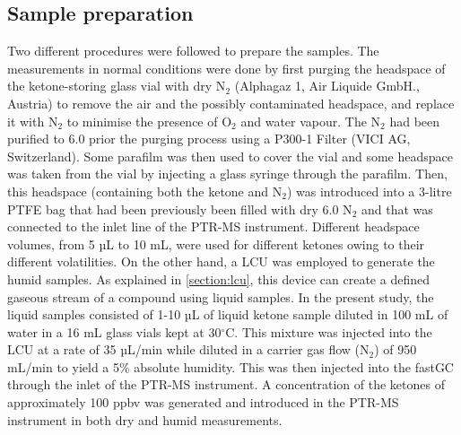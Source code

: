 \subsection{Sample preparation}
Two different procedures were followed to prepare the samples.
The measurements in normal conditions were done by first purging the headspace of the ketone-storing glass vial with dry N$_2$ (Alphagaz 1, Air Liquide GmbH., Austria) to remove the air and the possibly contaminated headspace, and replace it with N$_2$ to minimise the presence of O$_2$ and water vapour. The N$_2$ had been purified to 6.0 prior the purging process using a P300-1 Filter (VICI AG, Switzerland). Some parafilm was then used to cover the vial and some headspace was taken from the vial by injecting  a glass syringe through the parafilm. Then, this headspace (containing both the ketone and  N$_2$) was introduced into a 3-litre PTFE bag that had been previously been filled with dry 6.0 N$_2$ and that was connected to the inlet line of the PTR-MS instrument. Different headspace volumes, from 5 µL to 10 mL, were used for different ketones owing to their different volatilities.
On the other hand,  a LCU was employed to generate the humid samples. As explained in \autoref{section:lcu}, this device can create a defined gaseous stream of a compound using liquid samples.
In the present study, the liquid samples consisted of 1-10 µL of liquid ketone sample diluted in 100 mL of water in a 16 mL glass vials kept at 30$^{\circ}$C. This mixture was injected into the LCU at a rate of 35 µL/min while diluted in a carrier gas flow (N$_2$) of 950 mL/min to yield a 5\% absolute humidity. This  was then injected into the fastGC through the inlet of the PTR-MS instrument. A concentration of the ketones of approximately 100 ppbv was generated and introduced in the PTR-MS instrument in both dry and humid measurements.


